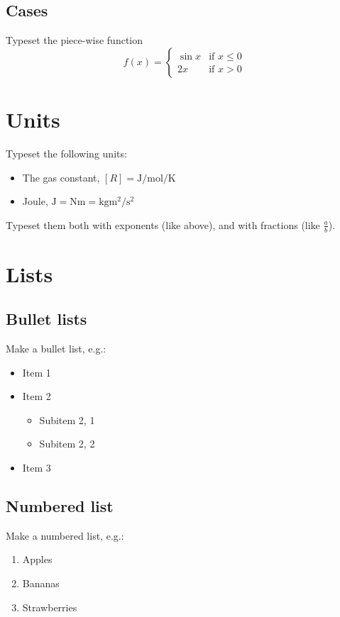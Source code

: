 \documentclass[a4paper, 12pt]{article}
\begin{document}
\subsection{Cases}
Typeset the piece-wise function
\begin{equation*}
 f(x) =
  \begin{cases}
   \sin{x} & \text{if } x \leq 0 \\
   2x       & \text{if } x > 0
  \end{cases}
\end{equation*}

\section{Units}
Typeset the following units:
\begin{itemize}
	\item The gas constant,  $[R] = \si{\joule\per\mole\per\kelvin}$
	\item Joule, $\si{\joule} = \si{\newton\meter} = \si{\kilogram\meter\squared\per\second\squared}$
\end{itemize} 
Typeset them both with exponents (like above), and with fractions (like $\frac{a}{b}$).

\section{Lists}
\subsection{Bullet lists}
Make a bullet list, e.g.:
\begin{itemize}
	\item Item 1
	\item Item 2
	\begin{itemize}
		\item Subitem 2, 1
		\item Subitem 2, 2
	\end{itemize}
	\item Item 3
\end{itemize}

\subsection{Numbered list}
Make a numbered list, e.g.:
\begin{enumerate}
	\item Apples
	\item Bananas
	\item Strawberries
\end{enumerate}
\end{document}
